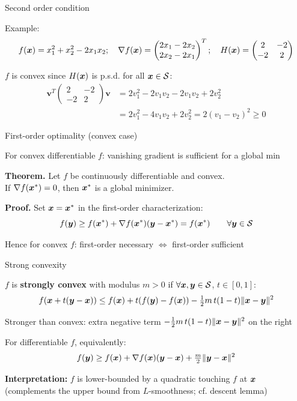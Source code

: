 \documentclass[11pt,compress,t,notes=noshow, xcolor=table]{beamer}
\begin{document}
\begin{framei}{Second order condition}
\item Example:
$$f(\bm{x}) = x_1^2 + x_2^2 - 2x_1x_2; \quad 
\nabla f(\bm{x}) = \begin{pmatrix}2x_1 - 2x_2 \\ 2x_2 - 2x_1\end{pmatrix}^T; \quad 
H(\bm{x}) = \begin{pmatrix} 2 & -2 \\ -2 & 2 \end{pmatrix}$$
\item $f$ is convex since $H(\bm{x})$ is p.s.d. for all $\bm{x}\in\mathcal{S}$:
\begin{align*}
\mathbf{v}^T\begin{pmatrix} 2 & -2 \\ -2 & 2 \end{pmatrix}\mathbf{v} &= 2v_1^2 - 2v_1v_2 -2v_1v_2 + 2v_2^2 \\
&= 2v_1^2 - 4v_1v_2 + 2v_2^2 = 2 (v_1 - v_2)^2 \ge 0
\end{align*}
\end{framei}


\begin{framei}{First-order optimality (convex case)}
\item For convex differentiable $f$: vanishing gradient is sufficient for a global min
\item \textbf{Theorem.} Let $f$ be continuously differentiable and convex.\\
If $\nabla f(\bm{x}^\ast) = 0$, then $\bm{x}^\ast$ is a global minimizer.
\item \textbf{Proof.} Set $\bm{x} = \bm{x}^\ast$ in the first-order characterization:
$$
f(\bm{y}) \geq f(\bm{x}^\ast) + \nabla f(\bm{x}^\ast)(\bm{y} - \bm{x}^\ast) = f(\bm{x}^\ast) \qquad \forall \bm{y} \in \mathcal{S}
$$
\item Hence for convex $f$: first-order necessary $\Leftrightarrow$ first-order sufficient
\end{framei}


\begin{framei}{Strong convexity}
\item $f$ is \textbf{strongly convex} with modulus $m > 0$ if $\forall \bm{x}, \bm{y} \in \mathcal{S}$, $t \in [0,1]$:
$$
f(\bm{x} + t(\bm{y}-\bm{x})) \leq f(\bm{x}) + t(f(\bm{y}) - f(\bm{x})) - \tfrac12 m\, t(1-t)\|\bm{x}-\bm{y}\|^2
$$
\item Stronger than convex: extra negative term $-\tfrac12 m\, t(1-t)\|\bm{x}-\bm{y}\|^2$ on the right
\item For differentiable $f$, equivalently:
$$
f(\bm{y}) \geq f(\bm{x}) + \nabla f(\bm{x})(\bm{y}-\bm{x}) + \tfrac{m}{2}\|\bm{y}-\bm{x}\|^2
$$
\item \textbf{Interpretation:} $f$ is lower-bounded by a quadratic touching $f$ at $\bm{x}$\\
(complements the upper bound from $L$-smoothness; cf. descent lemma)
\end{framei}
\end{document}
